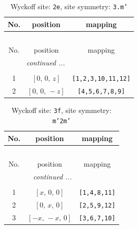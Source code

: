 \documentclass[fleqn,8pt]{jsarticle}
\begin{document}
\begin{longtable}{ccc}
\caption{Wyckoff site: {\tt 2e}, site symmetry: {\tt 3.m'}}
 \\
 \hline \hline
No. & position & mapping \\ \hline \endfirsthead

\multicolumn{2}{l}{\tablename\ \thetable{}} \\
 \hline \hline
No. & position & mapping \\ \hline \endhead

 \hline \hline
\multicolumn{2}{r}{\footnotesize\it continued ...} \\ \endfoot

 \hline \hline
\multicolumn{2}{r}{} \\ \endlastfoot

1 & $\left[ 0,\, 0,\, z \right]$ & {\tt [1,2,3,10,11,12]} \\ \hline
2 & $\left[ 0,\, 0,\, - z \right]$ & {\tt [4,5,6,7,8,9]} \\
\end{longtable}
\renewcommand{\arraystretch}{1.2}
\begin{longtable}{ccc}
\caption{Wyckoff site: {\tt 3f}, site symmetry: {\tt m'2m'}}
 \\
 \hline \hline
No. & position & mapping \\ \hline \endfirsthead

\multicolumn{2}{l}{\tablename\ \thetable{}} \\
 \hline \hline
No. & position & mapping \\ \hline \endhead

 \hline \hline
\multicolumn{2}{r}{\footnotesize\it continued ...} \\ \endfoot

 \hline \hline
\multicolumn{2}{r}{} \\ \endlastfoot

1 & $\left[ x,\, 0,\, 0 \right]$ & {\tt [1,4,8,11]} \\ \hline
2 & $\left[ 0,\, x,\, 0 \right]$ & {\tt [2,5,9,12]} \\ \hline
3 & $\left[ - x,\, - x,\, 0 \right]$ & {\tt [3,6,7,10]} \\
\end{longtable}
\renewcommand{\arraystretch}{1.2}
\end{document}

